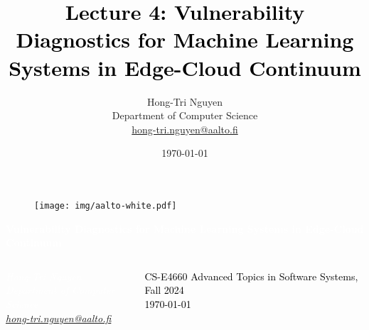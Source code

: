\documentclass[aspectratio=169]{beamer}
\title{\textcolor{black}{\textbf{Lecture 4:  Vulnerability Diagnostics for Machine Learning Systems in Edge-Cloud Continuum}}}
\author{Hong-Tri Nguyen\\ Department of Computer Science\\ \url{hong-tri.nguyen@aalto.fi}}
\date{\today}
\begin{document}

\logo{}
{
\begin{frame}
     \begin{figure}
        \hspace{-13cm}
        \vspace{1cm}
        \texttt{[image: img/aalto-white.pdf]}
    \end{figure}
  \textcolor{white}{\LARGE{\textbf{Vulnerability Diagnostics for Machine Learning Systems in Edge-Cloud Continuum}}}\\
  \vspace{0.5cm}
  \begin{columns}
      \begin{column}{0.58\textwidth}
          \fontsize{10pt}{3pt}\selectfont\textcolor{white}{\textit{Hong-Tri Nguyen\\ Department of Computer Science}}\\
          
          \textit{\href{emailto:hong-tri.nguyen@aalto.fi}{hong-tri.nguyen@aalto.fi}}
      \end{column}
      \hspace{-2cm}
      \begin{column}{0.5\textwidth}
        \begin{FlushRight}
          \fontsize{6pt}{4pt}\selectfont\textcolor{black}{CS-E4660 Advanced Topics in Software Systems, Fall 2024\\\today}
        \end{FlushRight}
      \end{column}
  \end{columns}
  
\end{frame}
}
\end{document}
